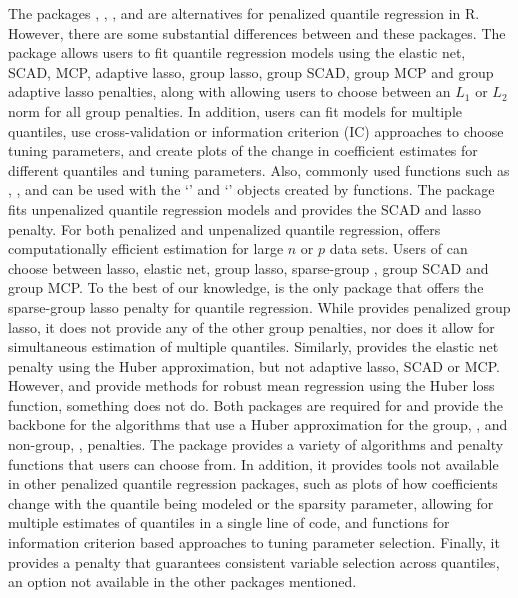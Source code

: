 The packages , , , and  are alternatives for penalized quantile regression in R. However, there are some substantial differences between  and these packages. The package  allows users to fit quantile regression models using the elastic net, SCAD, MCP, adaptive lasso, group lasso, group SCAD, group MCP and group adaptive lasso penalties, along with allowing users to choose between an \(L_1\) or \(L_2\) norm for all group penalties. In addition, users can fit models for multiple quantiles, use cross-validation or information criterion (IC) approaches to choose tuning parameters, and create plots of the change in coefficient estimates for different quantiles and tuning parameters. Also, commonly used functions such as , , and  can be used with the `' and `' objects created by  functions. The package  fits unpenalized quantile regression models and provides the SCAD and lasso penalty. For both penalized and unpenalized quantile regression,  offers computationally efficient estimation for large \(n\) or \(p\) data sets. Users of  can choose between lasso, elastic net, group lasso, sparse-group \citep{sparseGroup}, group SCAD and group MCP. To the best of our knowledge,  is the only package that offers the sparse-group lasso penalty for quantile regression. While  provides penalized group lasso, it does not provide any of the other group penalties, nor does it allow for simultaneous estimation of multiple quantiles. Similarly,  provides the elastic net penalty using the Huber approximation, but not adaptive lasso, SCAD or MCP. However,  and  provide methods for robust mean regression using the Huber loss function, something  does not do. Both packages are required for  and provide the backbone for the algorithms that use a Huber approximation for the group, , and non-group, , penalties. The package  provides a variety of algorithms and penalty functions that users can choose from. In addition, it provides tools not available in other penalized quantile regression packages, such as plots of how coefficients change with the quantile being modeled or the sparsity parameter, allowing for multiple estimates of quantiles in a single line of code, and functions for information criterion based approaches to tuning parameter selection. Finally, it provides a penalty that guarantees consistent variable selection across quantiles, an option not available in the other packages mentioned.

